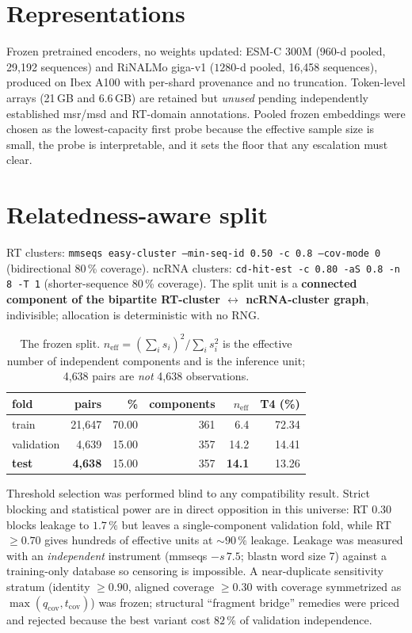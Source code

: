 \documentclass[11pt,a4paper]{article}
\begin{document}
\section{Representations}
Frozen pretrained encoders, no weights updated: ESM-C 300M ($960$-d pooled, 29{,}192 sequences)
and RiNALMo giga-v1 ($1280$-d pooled, 16{,}458 sequences), produced on Ibex A100 with per-shard
provenance and no truncation. Token-level arrays (21\,GB and 6.6\,GB) are retained but
\emph{unused} pending independently established msr/msd and RT-domain annotations. Pooled frozen
embeddings were chosen as the lowest-capacity first probe because the effective sample size is
small, the probe is interpretable, and it sets the floor that any escalation must clear.

\section{Relatedness-aware split}
RT clusters: \texttt{mmseqs easy-cluster --min-seq-id 0.50 -c 0.8 --cov-mode 0} (bidirectional
80\,\% coverage). ncRNA clusters: \texttt{cd-hit-est -c 0.80 -aS 0.8 -n 8 -T 1} (shorter-sequence
80\,\% coverage). The split unit is a \textbf{connected component of the bipartite RT-cluster
$\leftrightarrow$ ncRNA-cluster graph}, indivisible; allocation is deterministic with no RNG.

\begin{table}[h]\centering\small
\begin{tabular}{lrrrrr}\toprule
fold & pairs & \% & components & $n_{\mathrm{eff}}$ & T4 (\%) \\\midrule
train & 21{,}647 & 70.00 & 361 & 6.4 & 72.34 \\
validation & 4{,}639 & 15.00 & 357 & 14.2 & 14.41 \\
\textbf{test} & \textbf{4{,}638} & 15.00 & 357 & \textbf{14.1} & 13.26 \\\bottomrule
\end{tabular}\caption{The frozen split. $n_{\mathrm{eff}}=(\sum_i s_i)^2/\sum_i s_i^2$ is the
effective number of independent components and is the inference unit; 4{,}638 pairs are
\emph{not} 4{,}638 observations.}\end{table}

Threshold selection was performed blind to any compatibility result. Strict blocking and
statistical power are in direct opposition in this universe: RT $0.30$ blocks leakage to
$1.7\,\%$ but leaves a single-component validation fold, while RT $\geq 0.70$ gives hundreds of
effective units at $\sim 90\,\%$ leakage. Leakage was measured with an \emph{independent}
instrument (mmseqs $-s\,7.5$; blastn word size 7) against a training-only database so censoring
is impossible. A near-duplicate sensitivity stratum (identity $\geq 0.90$, aligned coverage
$\geq 0.30$ with coverage symmetrized as $\max(q_{\mathrm{cov}},t_{\mathrm{cov}})$) was frozen;
structural ``fragment bridge'' remedies were priced and rejected because the best variant cost
$82\,\%$ of validation independence.
\end{document}
